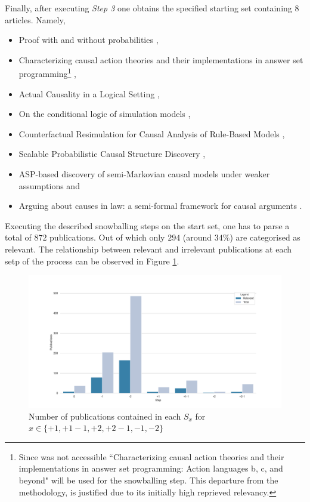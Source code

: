 \documentclass[11pt,a4paper]{book}
\theoremstyle{definition}
\theoremstyle{definition}
\theoremstyle{definition}
\theoremstyle{remark}
\newcommand{\pset}{S}
\begin{document}
Finally, after executing \emph{Step 3} one obtains the specified starting set containing $8$ articles. Namely,
\begin{itemize}
\item Proof with and without probabilities \parencite{verheij2017proof},
\item Characterizing causal action theories and their implementations in answer set programming\footnote{Since \parencite{zhang2017characterizing} was not accessible ``Characterizing causal action theories and their implementations in answer set programming: Action languages b, c, and beyond" \parencite{zhang2015characterizing} will be used for the snowballing step. This departure from the methodology, is justified due to its initially high reprieved relevancy.}  \parencite{zhang2017characterizing},
\item Actual Causality in a Logical Setting \parencite{bochman2018actual},
\item On the conditional logic of simulation models \parencite{ibeling2018conditional},
\item  Counterfactual Resimulation for Causal Analysis of Rule-Based Models \parencite{laurent2018counterfactual},
\item Scalable Probabilistic Causal Structure Discovery \parencite{sridhar2018scalable},
\item  ASP-based discovery of semi-Markovian causal models under weaker assumptions \parencite{zhang2019asp} and 
\item Arguing about causes in law: a semi-formal framework for causal arguments \parencite{Liepina2019ArguingAC}.
\end{itemize}

Executing the described snowballing steps on the start set, one has to parse a total of $872$ publications. Out of which only $294$ (around $34 \%$) are categorised as relevant. The relationship between relevant and irrelevant publications at each setp of the process can be observed in Figure \ref{fig:pgraph-relevant_publications_per_step}.


\begin{figure}[h!]
\includegraphics[width=\textwidth]{relevant_publications_per_step.png}
\caption{Number of publications contained in each $\pset_x$ for $x \in \{ \mathit{+1}, \mathit{+1-1}, \mathit{+2}, \mathit{+2-1}, \mathit{-1}, \mathit{-2}\}$}
\label{fig:pgraph-relevant_publications_per_step}
\end{figure}
\end{document}
